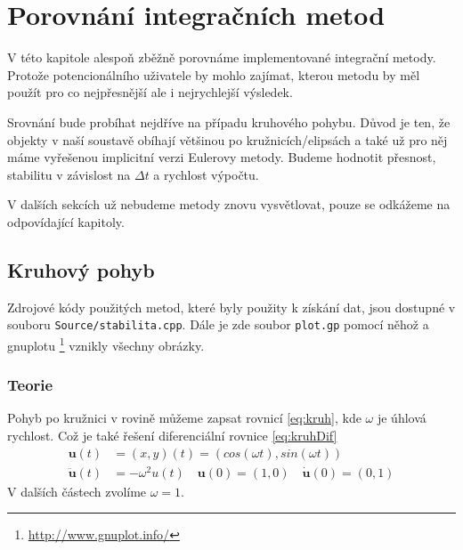 \chapter{Porovnání integračních metod}
\label{chap:compMethods}
V této kapitole alespoň zběžně porovnáme implementované integrační metody. Protože potencionálního uživatele by mohlo zajímat, kterou metodu by měl použít pro co nejpřesnější ale i nejrychlejší výsledek.

Srovnání bude probíhat nejdříve na případu kruhového pohybu. Důvod je ten, že objekty v naší soustavě obíhají většinou po kružnicích/elipsách a také už pro něj máme vyřešenou implicitní verzi Eulerovy metody. Budeme hodnotit přesnost, stabilitu v závislost na $ \Delta t $ a rychlost výpočtu.

V dalších sekcích už nebudeme metody znovu vysvětlovat, pouze se odkážeme na odpovídající kapitoly.

\section{Kruhový pohyb}
Zdrojové kódy použitých metod, které byly použity k získání dat, jsou dostupné v souboru \texttt{Source/stabilita.cpp}. Dále je zde soubor \texttt{plot.gp} pomocí něhož a gnuplotu
\footnote{\url{http://www.gnuplot.info/}}
 vznikly všechny obrázky.
\subsection{Teorie}
Pohyb po kružnici v rovině můžeme zapsat rovnicí \eqref{eq:kruh}, kde $\omega$ je úhlová rychlost. Což je také řešení diferenciální rovnice \eqref{eq:kruhDif}
\begin{align}
\label{eq:kruh}
\boldsymbol{u}(t) &= (x,y)(t)=(cos(\omega t),sin(\omega t))\\
\label{eq:kruhDif}
\ddot{\boldsymbol{u}}(t)&=-\omega^2u(t) \quad \boldsymbol{u}(0)=(1,0) \quad \dot{\boldsymbol{u}}(0)=(0,1)
\end{align}
V dalších částech zvolíme $ \omega = 1 $.
